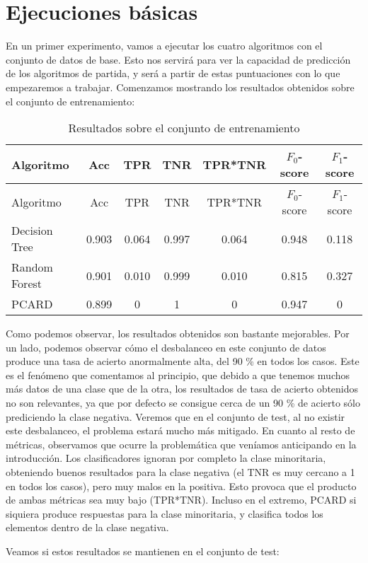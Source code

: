 \documentclass[
  a4paper,
,tablecaptionabove
]{scrartcl}
\begin{document}
\hypertarget{ejecuciones-buxe1sicas}{%
\section{Ejecuciones básicas}\label{ejecuciones-buxe1sicas}}

En un primer experimento, vamos a ejecutar los cuatro algoritmos con el
conjunto de datos de base. Esto nos servirá para ver la capacidad de
predicción de los algoritmos de partida, y será a partir de estas
puntuaciones con lo que empezaremos a trabajar. Comenzamos mostrando los
resultados obtenidos sobre el conjunto de entrenamiento:

\begin{longtable}[]{@{}lcccccc@{}}
\caption{Resultados sobre el conjunto de entrenamiento}\tabularnewline
\toprule
Algoritmo & Acc & TPR & TNR & TPR*TNR & \(F_0\)-score &
\(F_1\)-score\tabularnewline
\midrule
\endfirsthead
\toprule
Algoritmo & Acc & TPR & TNR & TPR*TNR & \(F_0\)-score &
\(F_1\)-score\tabularnewline
\midrule
\endhead
Decision Tree & 0.903 & 0.064 & 0.997 & 0.064 & 0.948 &
0.118\tabularnewline
Random Forest & 0.901 & 0.010 & 0.999 & 0.010 & 0.815 &
0.327\tabularnewline
PCARD & 0.899 & 0 & 1 & 0 & 0.947 & 0\tabularnewline
\bottomrule
\end{longtable}

Como podemos observar, los resultados obtenidos son bastante mejorables.
Por un lado, podemos observar cómo el desbalanceo en este conjunto de
datos produce una tasa de acierto anormalmente alta, del 90 \% en todos
los casos. Este es el fenómeno que comentamos al principio, que debido a
que tenemos muchos más datos de una clase que de la otra, los resultados
de tasa de acierto obtenidos no son relevantes, ya que por defecto se
consigue cerca de un 90 \% de acierto sólo prediciendo la clase
negativa. Veremos que en el conjunto de test, al no existir este
desbalanceo, el problema estará mucho más mitigado. En cuanto al resto
de métricas, observamos que ocurre la problemática que veníamos
anticipando en la introducción. Los clasificadores ignoran por completo
la clase minoritaria, obteniendo buenos resultados para la clase
negativa (el TNR es muy cercano a 1 en todos los casos), pero muy malos
en la positiva. Esto provoca que el producto de ambas métricas sea muy
bajo (TPR*TNR). Incluso en el extremo, PCARD si siquiera produce
respuestas para la clase minoritaria, y clasifica todos los elementos
dentro de la clase negativa.

Veamos si estos resultados se mantienen en el conjunto de test:
\end{document}
